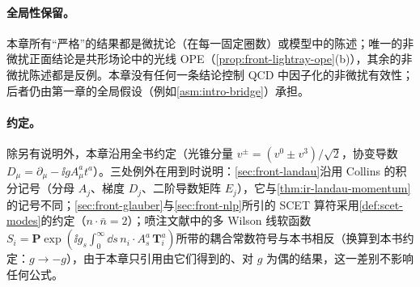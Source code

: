 \paragraph{全局性保留。}本章所有“严格”的结果都是微扰论（在每一固定圈数）或模型中的陈述；唯一的非微扰正面结论是共形场论中的光线 OPE（\cref{prop:front-lightray-ope}(b)），其余的非微扰陈述都是反例。本章没有任何一条结论控制 QCD 中因子化的非微扰有效性；后者仍由第一章的全局假设（例如\cref{asm:intro-bridge}）承担。

\paragraph{约定。}除另有说明外，本章沿用全书约定（光锥分量 $v^\pm=(v^0\pm v^3)/\sqrt2$，协变导数 $D_\mu=\partial_\mu-\ii gA_\mu^at^a$）。三处例外在用到时说明：\cref{sec:front-landau}沿用 Collins 的积分记号（分母 $A_j$、梯度 $D_j$、二阶导数矩阵 $E_j$），它与\cref{thm:ir-landau-momentum}的记号不同；\cref{sec:front-glauber}与\cref{sec:front-nlp}所引的 SCET 算符采用\cref{def:scet-modes}的约定（$n\cdot\bar n=2$）；喷注文献中的多 Wilson 线软函数 $S_i=\mathbf P\exp(\ii g_s\int_0^\infty\dd s\,n_i\cdot A^a_s\,\mathbf T^a_i)$\cite{Becher:2016mmh}所带的耦合常数符号与本书相反（换算到本书约定：$g\to-g$），由于本章只引用由它们得到的、对 $g$ 为偶的结果，这一差别不影响任何公式。


